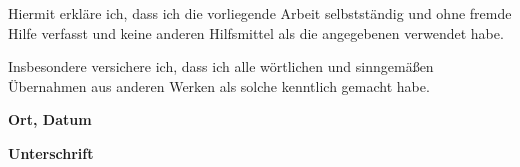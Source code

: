 
\begin{spacing}{1.5}
    Hiermit erkläre ich, dass ich die vorliegende Arbeit selbstständig und ohne fremde Hilfe  
    verfasst und keine anderen Hilfsmittel als die angegebenen verwendet habe.  
    
    Insbesondere versichere ich, dass ich alle wörtlichen und sinngemäßen Übernahmen aus  
    anderen Werken als solche kenntlich gemacht habe.  
    \end{spacing}
    
    \vspace{2.5cm}
    
    \noindent
    \begin{minipage}[t]{0.45\textwidth}
      \centering
      \textbf{Ort, Datum}
    \end{minipage}
    \hfill
    \begin{minipage}[t]{0.45\textwidth}
      \centering
      \textbf{Unterschrift}
    \end{minipage}
    
